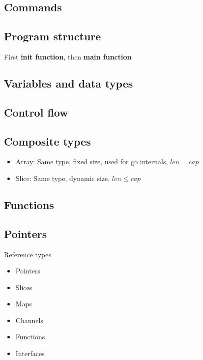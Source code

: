 \documentclass[../../main.tex]{subfiles}
\begin{document}
\subsection{Commands}


\subsection{Program structure}
First \textbf{init function}, then \textbf{main function}


\subsection{Variables and data types}


\subsection{Control flow}


\subsection{Composite types}
\begin{itemize}
    \item Array: Same type, fixed size, used for go internals, $len = cap$
    \item Slice: Same type, dynamic size, $len \le cap$
\end{itemize}


\subsection{Functions}


\subsection{Pointers}
Reference types
\begin{itemize}
    \item Pointers
    \item Slices
    \item Maps
    \item Channels
    \item Functions
    \item Interfaces
\end{itemize}
\end{document}
